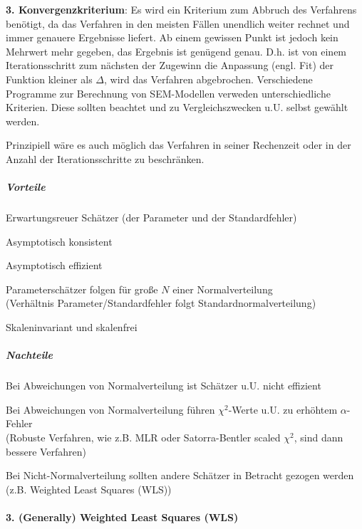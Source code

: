 \documentclass{article}
\numberwithin{equation}{section}
\begin{document}
\textbf{3. Konvergenzkriterium}: Es wird ein Kriterium zum Abbruch des Verfahrens benötigt, da das Verfahren in den meisten Fällen unendlich weiter rechnet und immer genauere Ergebnisse liefert. Ab einem gewissen Punkt ist jedoch kein Mehrwert mehr gegeben, das Ergebnis ist genügend genau. D.h. ist von einem Iterationsschritt zum nächsten der Zugewinn die Anpassung (engl. Fit) der Funktion kleiner als $\Delta$, wird das Verfahren abgebrochen. Verschiedene Programme zur Berechnung von SEM-Modellen verweden unterschiedliche Kriterien. Diese sollten beachtet und zu Vergleichszwecken u.U. selbst gewählt werden.

Prinzipiell wäre es auch möglich das Verfahren in seiner Rechenzeit oder in der Anzahl der Iterationsschritte zu beschränken.

\subparagraph*{Vorteile}

\begin{compactitem}
\item Erwartungsreuer Schätzer (der Parameter und der Standardfehler)
\item Asymptotisch konsistent
\item Asymptotisch effizient
\item Parameterschätzer folgen für große $N$ einer Normalverteilung\\ (Verhältnis Parameter/Standardfehler folgt Standardnormalverteilung)
\item Skaleninvariant und skalenfrei
\end{compactitem}

\subparagraph*{Nachteile}

\begin{compactitem}
\item Bei Abweichungen von Normalverteilung ist Schätzer u.U. nicht effizient
\item Bei Abweichungen von Normalverteilung führen $\chi^2$-Werte u.U. zu erhöhtem $\alpha$-Fehler\\ (Robuste Verfahren, wie z.B. MLR oder Satorra-Bentler scaled $\chi^2$, sind dann bessere Verfahren)
\item Bei Nicht-Normalverteilung sollten andere Schätzer in Betracht gezogen werden (z.B. Weighted Least Squares (WLS))
\end{compactitem}

\paragraph*{3. (Generally) Weighted Least Squares (WLS)}
\end{document}
